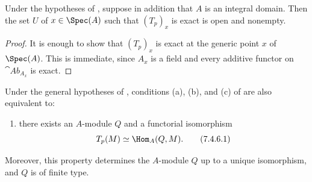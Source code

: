 \begin{corollary}[7.4.5]
\label{III.7.4.5}
Under the hypotheses of , suppose in addition
that $A$ is an integral domain.  Then the set $U$ of
$x\in\Spec(A)$ such that $(T_p)_x$ is exact is open and
nonempty.
\end{corollary}

\begin{proof}
It is enough to show that $(T_p)_x$ is exact at the generic
point $x$ of $\Spec(A)$.  This is immediate, since $A_x$ is a
field and every additive functor on $\cat{Ab}_{A_x}$ is exact.
\end{proof}

\begin{proposition}[7.4.6]
\label{III.7.4.6}
Under the general hypotheses of , conditions
(a), (b), and (c) of  are also equivalent to:
\begin{enumerate}
  \item[(d)] there exists an $A$-module $Q$ and a functorial
    isomorphism
    \[
      T_p(M)\simeq\Hom_A(Q,M).
      \tag{7.4.6.1}\label{III.7.4.6.1.eq}
    \]
\end{enumerate}
Moreover, this property determines the $A$-module $Q$ up to a
unique isomorphism, and $Q$ is of finite type.
\end{proposition}

